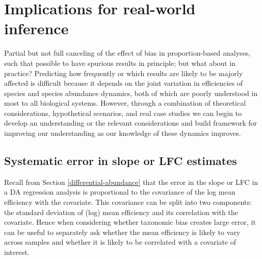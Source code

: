 \documentclass[
]{article}
\theoremstyle{definition}
\theoremstyle{definition}
\theoremstyle{definition}
\theoremstyle{definition}
\theoremstyle{remark}
\begin{document}
\hypertarget{implications}{%
\section{Implications for real-world inference~}\label{implications}}

Partial but not full canceling of the effect of bias in proportion-based analyses, such that possible to have spurious results in principle; but what about in practice?
Predicting how frequently or which results are likely to be majorly affected is difficult because it depends on the joint variation in efficiencies of species and species abundance dynamics, both of which are poorly understood in most to all biological systems.
However, through a combination of theoretical considerations, hypothetical scenarios, and real case studies we can begin to develop an understanding or the relevant considerations and build framework for improving our understanding as our knowledge of these dynamics improves.

\hypertarget{systematic-error-in-slope-or-lfc-estimates}{%
\subsection{Systematic error in slope or LFC estimates}\label{systematic-error-in-slope-or-lfc-estimates}}

Recall from Section \ref{differential-abundance} that the error in the slope or LFC in a DA regression analysis is proportional to the covariance of the log mean efficiency with the covariate.
This covariance can be split into two components: the standard deviation of (log) mean efficiency and its correlation with the covariate.
Hence when considering whether taxonomic bias creates large error, it can be useful to separately ask whether the mean efficiency is likely to vary across samples and whether it is likely to be correlated with a covariate of interest.
\end{document}
